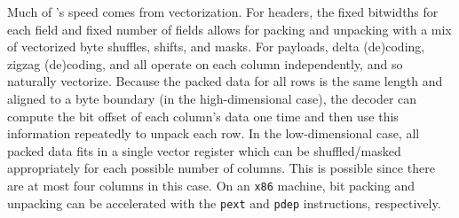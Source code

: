 Much of \mine's speed comes from vectorization. For headers, the fixed bitwidths for each field and fixed number of fields allows for packing and unpacking with a mix of vectorized byte shuffles, shifts, and masks. For payloads, delta (de)coding, zigzag (de)coding, and \fire all operate on each column independently, and so naturally vectorize. Because the packed data for all rows is the same length and aligned to a byte boundary (in the high-dimensional case), the decoder can compute the bit offset of each column's data one time and then use this information repeatedly to unpack each row. In the low-dimensional case, all packed data fits in a single vector register which can be shuffled/masked appropriately for each possible number of columns. This is possible since there are at most four columns in this case. On an \texttt{x86} machine, bit packing and unpacking can be accelerated with the \texttt{pext} and \texttt{pdep} instructions, respectively.

